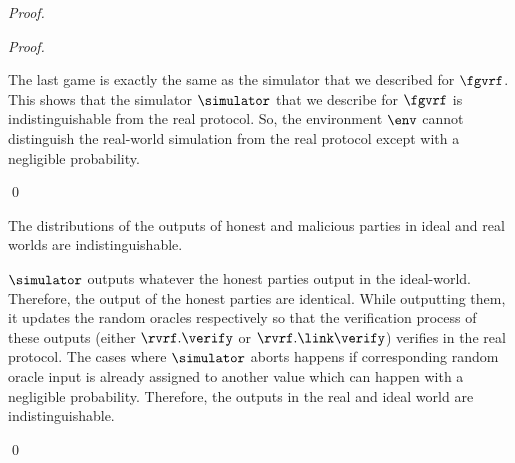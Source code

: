 \begin{proof}
\begin{proof}
\begin{enumerate}[label={{Game} }{{\arabic*}}, start = 0]
			The last game is exactly the same as the simulator that we described for $ \fgvrf $. This shows that the simulator $ \simulator $ that we describe for $ \fgvrf $ is indistinguishable from the real protocol. So, the environment $ \env $ cannot distinguish the real-world simulation from the real protocol except with a negligible probability. 
				
		
		\end{enumerate}
	\qed
	\end{proof}	

	\begin{claim}
		The distributions of the outputs of honest and malicious parties in ideal and real worlds are indistinguishable.
	\end{claim}
	$ \simulator $ outputs whatever the honest parties output in the ideal-world. 
	Therefore, the output of the honest parties are identical. While outputting them, it updates the random oracles respectively so that the verification process of these outputs (either $ \rvrf.\verify $ or $ \rvrf.\link\verify $) verifies in the real protocol. The cases where $ \simulator $ aborts happens if corresponding random oracle input is already assigned to another value which can happen with a negligible probability. Therefore, the outputs in the real and ideal world are indistinguishable.
	
\qed
\end{proof}
